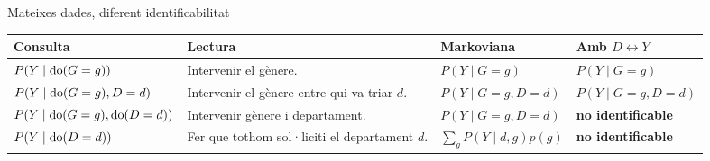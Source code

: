 \documentclass{bestbeamer}
\begin{document}
\begin{frame}{Mateixes dades, diferent identificabilitat}
  \scriptsize
  \begin{tabularx}{\textwidth}{
    >{\RaggedRight\arraybackslash}p{34mm}
    >{\RaggedRight\arraybackslash}X
    >{\Centering\arraybackslash}p{27mm}
    >{\Centering\arraybackslash}p{34mm}
  }
    \toprule
    Consulta & Lectura & Markoviana & Amb $D\leftrightarrow Y$ \\
    \midrule
    $P(Y\mid\operatorname{do}(G=g))$
      & Intervenir el gènere.
      & $P(Y\mid G=g)$
      & $P(Y\mid G=g)$ \\
    \addlinespace
    $P(Y\mid\operatorname{do}(G=g),D=d)$
      & Intervenir el gènere entre qui va triar $d$.
      & $P(Y\mid G=g,D=d)$
      & $P(Y\mid G=g,D=d)$ \\
    \addlinespace
    $P(Y\mid\operatorname{do}(G=g),\operatorname{do}(D=d))$
      & Intervenir gènere i departament.
      & $P(Y\mid G=g,D=d)$
      & \textbf{no identificable} \\
    \addlinespace
    $P(Y\mid\operatorname{do}(D=d))$
      & Fer que tothom sol·liciti el departament $d$.
      & $\sum_g P(Y\mid d,g)p(g)$
      & \textbf{no identificable} \\
    \bottomrule
  \end{tabularx}
  \vfill
  \begin{center}
  \end{center}
\end{frame}
\end{document}
